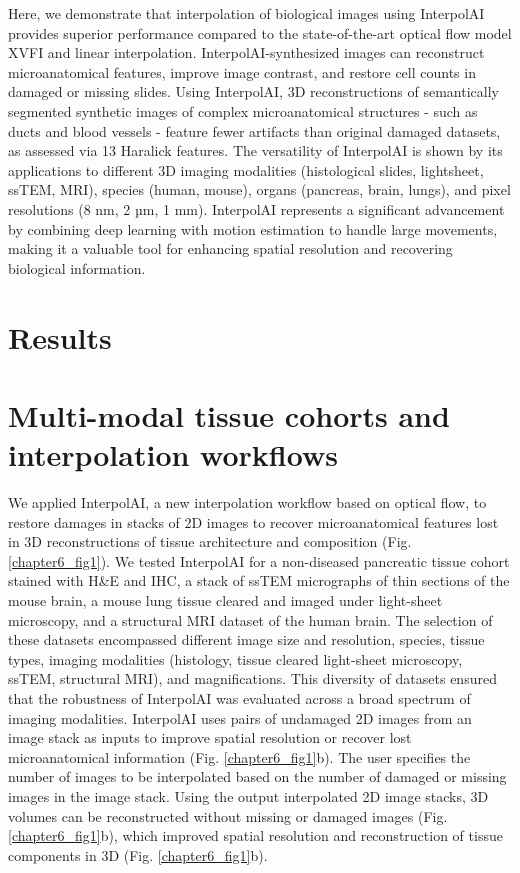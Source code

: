 \begin{refsection}
    Here, we demonstrate that interpolation of biological images using InterpolAI provides superior performance compared to the state-of-the-art optical flow model XVFI\cite{sim2021a} and linear interpolation. InterpolAI-synthesized images can reconstruct microanatomical features, improve image contrast, and restore cell counts in damaged or missing slides. Using InterpolAI, 3D reconstructions of semantically segmented synthetic images of complex microanatomical structures - such as ducts and blood vessels - feature fewer artifacts than original damaged datasets, as assessed via 13 Haralick features. The versatility of InterpolAI is shown by its applications to different 3D imaging modalities (histological slides, lightsheet, ssTEM, MRI), species (human, mouse), organs (pancreas, brain, lungs), and pixel resolutions (8 nm, 2 µm, 1 mm). InterpolAI represents a significant advancement by combining deep learning with motion estimation to handle large movements, making it a valuable tool for enhancing spatial resolution and recovering biological information.
    
    \section{Results}
    \section{Multi-modal tissue cohorts and interpolation workflows}
    We applied InterpolAI, a new interpolation workflow based on optical flow, to restore damages in stacks of 2D images to recover microanatomical features lost in 3D reconstructions of tissue architecture and composition (Fig. \ref{chapter6_fig1})\cite{li2023a}. We tested InterpolAI for a non-diseased pancreatic tissue cohort stained with H\&E and IHC, a stack of ssTEM micrographs of thin sections of the mouse brain, a mouse lung tissue cleared and imaged under light-sheet microscopy, and a structural MRI dataset of the human brain. The selection of these datasets encompassed different image size and resolution, species, tissue types, imaging modalities (histology, tissue cleared light-sheet microscopy, ssTEM, structural MRI), and magnifications. This diversity of datasets ensured that the robustness of InterpolAI was evaluated across a broad spectrum of imaging modalities.
    InterpolAI uses pairs of undamaged 2D images from an image stack as inputs to improve spatial resolution or recover lost microanatomical information (Fig. \ref{chapter6_fig1}b). The user specifies the number of images to be interpolated based on the number of damaged or missing images in the image stack. Using the output interpolated 2D image stacks, 3D volumes can be reconstructed without missing or damaged images (Fig. \ref{chapter6_fig1}b), which improved spatial resolution and reconstruction of tissue components in 3D (Fig. \ref{chapter6_fig1}b). 


\end{refsection}
